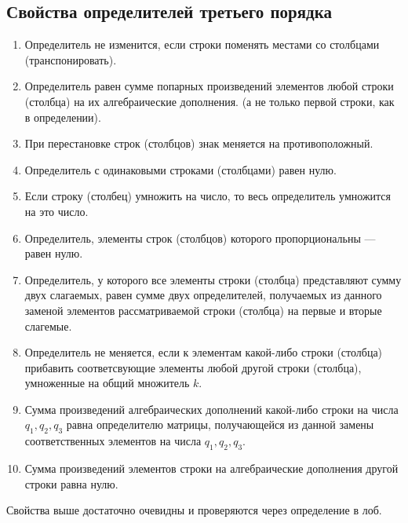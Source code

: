 \documentclass[12pt, a4paper]{article}
\begin{document}
    \subsection{Свойства определителей третьего порядка}
    \begin{enumerate}
        \item Определитель не изменится, если строки поменять местами со столбцами (транспонировать).
        \item Определитель равен сумме попарных произведений элементов любой строки (столбца) на их алгебраические дополнения. (а не только первой строки, как в определении).
        \item При перестановке строк (столбцов) знак меняется на противоположный.
        \item Определитель с одинаковыми строками (столбцами) равен нулю.
        \item Если строку (столбец) умножить на число, то весь определитель умножится на это число.
        \item Определитель, элементы строк (столбцов) которого пропорциональны --- равен нулю.
        \item Определитель, у которого все элементы строки (столбца) представляют сумму двух слагаемых, равен сумме двух определителей, получаемых из данного заменой элементов рассматриваемой строки (столбца) на первые и вторые слагемые.
        \item Определитель не меняется, если к элементам какой-либо строки (столбца) прибавить соответсвующие элементы любой другой строки (столбца), умноженные на общий множитель \( k \).
        \item Сумма произведений алгебраических дополнений какой-либо строки на числа \( q_{1}, q_{2}, q_{3} \) равна определителю матрицы, получающейся из данной замены соответственных элементов на числа \( q_{1}, q_{2}, q_{3} \).
        \item Сумма произведений элементов строки на алгебраические дополнения другой строки равна нулю.
    \end{enumerate}

    \begin{rem}
        Свойства выше достаточно очевидны и проверяются через определение в лоб.
    \end{rem}
\end{document}
